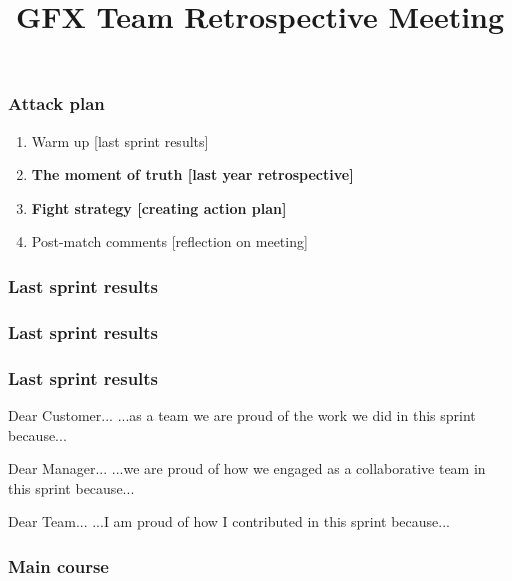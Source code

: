 \documentclass{beamer}
\title{GFX Team Retrospective Meeting}
\begin{document}
\maketitle

\begin{frame}
\frametitle{Attack plan}
\begin{enumerate}
    \item Warm up [last sprint results]
    \item \textbf{The moment of truth [last year retrospective]}
    \item \textbf{Fight strategy [creating action plan]}
    \item Post-match comments [reflection on meeting]
\end{enumerate}
\end{frame}

\begin{frame}
\frametitle{Last sprint results}
\end{frame}

\begin{frame}
\frametitle{Last sprint results}
\bigbreak
{}
\end{frame}

\begin{frame}
\frametitle{Last sprint results}

\begin{block}{Dear Customer...}
...as a team we are proud of the work we did in this sprint because...
\end{block}

\begin{block}{Dear Manager...}
...we are proud of how we engaged as a collaborative team in this sprint because...
\end{block}

\begin{block}{Dear Team...}
...I am proud of how I contributed in this sprint because...
\end{block}

\end{frame}

\begin{frame}
\frametitle{Main course}
\end{frame}
\end{document}
